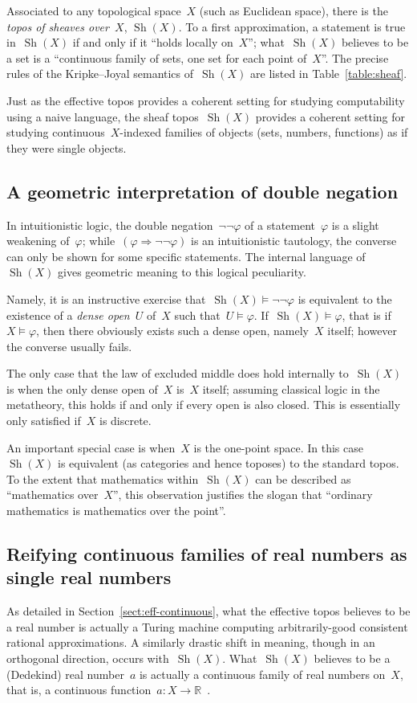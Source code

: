 \documentclass[oneside,reqno]{amsart}
\theoremstyle{definition}
\theoremstyle{plain}
\theoremstyle{remark}
\newcommand{\RR}{\mathbb{R}}
\DeclareMathOperator{\Sh}{Sh}
\renewcommand{\_}{\mathpunct{.}\,}
\newcommand{\effective}{ef{}fective\xspace}
\newcommand{\?}{\,{:}\,}
\begin{document}
Associated to any topological space~$X$ (such as Euclidean space), there is the
\emph{topos of sheaves over~$X$}, $\Sh(X)$. To a first approximation, a
statement is true in~$\Sh(X)$ if and only if it ``holds locally on~$X$'';
what~$\Sh(X)$ believes to be a set is a ``continuous family of sets, one set
for each point of~$X$''. The precise rules of the Kripke--Joyal semantics
of~$\Sh(X)$ are listed in Table~\ref{table:sheaf}.

Just as the \effective topos provides a coherent setting for studying
computability using a naive language, the sheaf topos~$\Sh(X)$ provides a
coherent setting for studying continuous~$X$-indexed families of objects (sets,
numbers, functions) as if they were single objects.


\subsection{A geometric interpretation of double negation}
In intuitionistic logic, the double negation~$\neg\neg\varphi$ of a
statement~$\varphi$ is a slight weakening of~$\varphi$; while~$(\varphi
\Rightarrow \neg\neg\varphi)$ is an intuitionistic tautology, the converse can
only be shown for some specific statements. The internal language of~$\Sh(X)$
gives geometric meaning to this logical peculiarity.

Namely, it is an instructive exercise that~$\Sh(X) \models \neg\neg\varphi$ is equivalent to the
existence of a \emph{dense open}~$U$ of~$X$ such that~$U \models \varphi$.
If~$\Sh(X) \models \varphi$, that is if~$X \models \varphi$, then there
obviously exists such a dense open, namely~$X$ itself; however the converse
usually fails.

The only case that the law of excluded middle does hold internally to~$\Sh(X)$
is when the only dense open of~$X$ is~$X$ itself; assuming classical logic in
the metatheory, this holds if and only if every open is also closed. This is
essentially only satisfied if~$X$ is discrete.

An important special case is when~$X$ is the one-point space. In this
case~$\Sh(X)$ is equivalent (as categories and hence toposes) to the standard
topos. To the extent that mathematics within~$\Sh(X)$ can be described as ``mathematics
over~$X$'', this observation justifies the slogan that ``ordinary mathematics
is mathematics over the point''.


\subsection{Reifying continuous families of real numbers as single real numbers}
As detailed in Section~\ref{sect:eff-continuous}, what the \effective topos believes to be a real number is
actually a Turing machine computing arbitrarily-good consistent rational
approximations. A similarly drastic shift in meaning, though in an orthogonal
direction, occurs with~$\Sh(X)$. What~$\Sh(X)$ believes to be a (Dedekind) real
number~$a$ is actually a continuous family of real numbers on~$X$, that is, a
continuous function~$a : X \to \RR$~\cite[Corollary~D4.7.5]{johnstone:elephant}.
\end{document}
